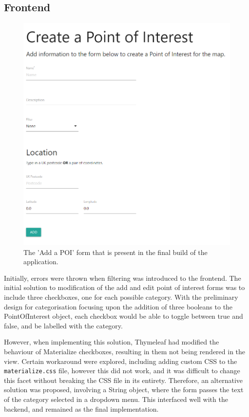 \subsection{Frontend}
\begin{figure}[H]
	\includegraphics[scale=1.0]{diagrams/submittedForm}
	\caption{The 'Add a POI' form that is present in the final build of the application.}
\end{figure}	

Initially, errors were thrown when filtering was introduced to the frontend. The initial solution to modification of the add and edit point of interest forms was to include three checkboxes, one for each possible category. With the preliminary design for categorisation focusing upon the addition of three booleans to the PointOfInterest object, each checkbox would be able to toggle between true and false, and be labelled with the category.

However, when implementing this solution, Thymeleaf had modified the behaviour of Materialize checkboxes, resulting in them not being rendered in the view. Certain workaround were explored, including adding custom CSS to the \texttt{materialize.css} file, however this did not work, and it was difficult to change this facet without breaking the CSS file in its entirety. Therefore, an alternative solution was proposed, involving a String object, where the form passes the text of the category selected in a dropdown menu. This interfaced well with the backend, and remained as the final implementation.

